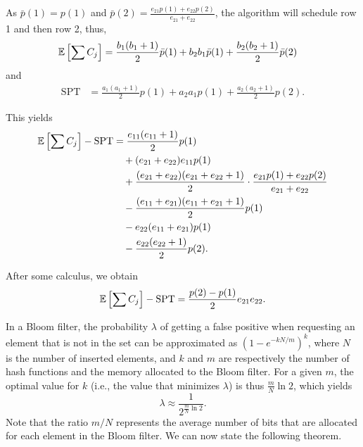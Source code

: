 \documentclass{article}
\begin{document}
As \(\bar{p}(1)=p(1)\) and \(\bar{p}(2)=\frac{e_{21}p(1)+e_{22}p(2)}{e_{21}+e_{22}}\), the algorithm will schedule row 1 and then row 2, thus,
\begin{align*}
    \mathbb{E}\left[\sum C_j\right]
    &=\frac{b_1(b_1+1)}{2}\bar{p}(1)+b_2b_1\bar{p}(1)+\frac{b_2(b_2+1)}{2}\bar{p}(2)
\end{align*}
and
\begin{align*}
    \text{SPT}
    &=\frac{a_1(a_1+1)}{2}p(1)+a_2a_1p(1)+\frac{a_2(a_2+1)}{2}p(2).
\end{align*}

This yields
\begin{align*}
    \mathbb{E}\left[\sum C_j\right]-\text{SPT}
    &=\frac{e_{11}(e_{11}+1)}{2}p(1)\\
    &\quad+(e_{21}+e_{22})e_{11}p(1)\\
    &\quad+\frac{(e_{21}+e_{22})(e_{21}+e_{22}+1)}{2}\cdot \frac{e_{21}p(1)+e_{22}p(2)}{e_{21}+e_{22}}\\
    &\quad-\frac{(e_{11}+e_{21})(e_{11}+e_{21}+1)}{2}p(1)\\
    &\quad-e_{22}(e_{11}+e_{21})p(1)\\
    &\quad-\frac{e_{22}(e_{22}+1)}{2}p(2).
\end{align*}

After some calculus, we obtain
\begin{equation}
    \label{eq.diff}
    \mathbb{E}\left[\sum C_j\right]-\text{SPT}=\frac{p(2)-p(1)}{2}e_{21}e_{22}.
\end{equation}

In a Bloom filter, the probability \(\lambda\) of getting a false positive when requesting an element that is not in the set can be approximated as \(\left(1-e^{-kN/m}\right)^k\), where \(N\) is the number of inserted elements, and \(k\) and \(m\) are respectively the number of hash functions and the memory allocated to the Bloom filter.
For a given \(m\), the optimal value for \(k\) (i.e., the value that minimizes \(\lambda\)) is thus \(\frac{m}{N}\ln 2\), which yields
\[
    \lambda\approx\frac{1}{2^{\frac{m}{N}\ln 2}}.
\]
Note that the ratio \(m/N\) represents the average number of bits that are allocated for each element in the Bloom filter.
We can now state the following theorem.
\end{document}
